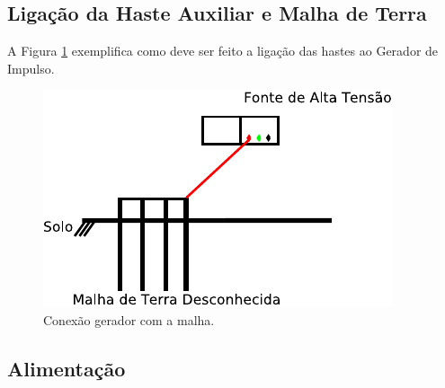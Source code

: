 \documentclass[a4paper, 10pt]{article}
\begin{document}
\subsection{Ligação da Haste Auxiliar e Malha de Terra}

A Figura \ref{fig_conexao_modo1} exemplifica como deve ser feito a ligação das hastes 
ao Gerador de Impulso. 

\begin{figure}[!h]
        \caption{\label{fig_conexao_modo1}Conexão gerador com a malha.}
	    \begin{center}
            \includegraphics[scale=1.2]{../fotos/conexoes/hastes_modo_1.pdf}
	    \end{center}
\end{figure}






\newpage
\subsection{Alimentação}
\label{sec_alimentacao}
\end{document}
